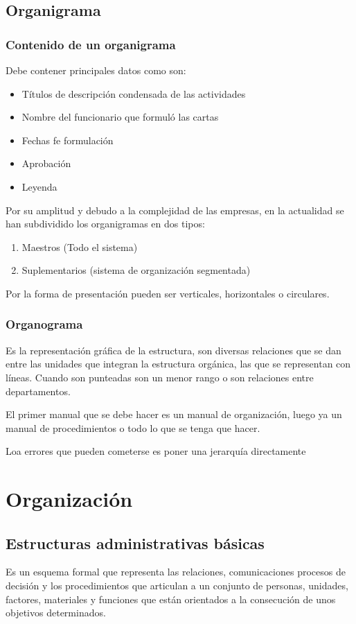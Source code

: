 \subsection{Organigrama}
\subsubsection{Contenido de un organigrama}
Debe contener principales datos como son:
\begin{itemize}
    \item Títulos de descripción condensada de las actividades
    \item Nombre del funcionario que formuló las cartas
    \item Fechas fe formulación
    \item Aprobación
    \item Leyenda
\end{itemize}
Por su amplitud y debudo a la complejidad de las empresas, en la actualidad se han subdividido los organigramas en dos tipos:
\begin{enumerate}
    \item Maestros (Todo el sistema)
    \item Suplementarios (sistema de organización segmentada)
\end{enumerate}
Por la forma de presentación pueden ser verticales, horizontales o circulares.
\subsubsection{Organograma}
Es la representación gráfica de la estructura, son diversas relaciones que se dan entre las unidades que integran la estructura orgánica, las que se representan con líneas. Cuando son punteadas son un menor rango o son relaciones entre departamentos.

El primer manual que se debe hacer es un manual de organización, luego ya un manual de procedimientos o todo lo que se tenga que hacer.

Loa errores que pueden cometerse es poner una jerarquía directamente

\section{Organización}
\subsection{Estructuras administrativas básicas}
Es un esquema formal que representa las relaciones, comunicaciones procesos de decisión y los procedimientos que articulan a un conjunto de personas, unidades, factores, materiales y funciones que están orientados a la consecución de unos objetivos determinados.

